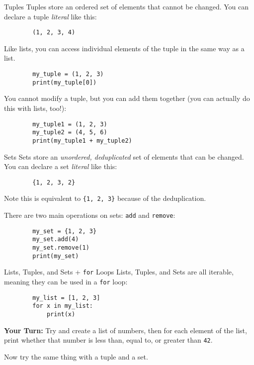 \documentclass{acm}
\begin{document}
\begin{frame}[fragile]{Tuples}
    Tuples store an ordered set of elements that cannot be changed. You can
    declare a tuple \textit{literal} like this:

    \begin{verbatim}
        (1, 2, 3, 4)
    \end{verbatim}

    \pause
    Like lists, you can access individual elements of the tuple in the same way
    as a list.
    \begin{verbatim}
        my_tuple = (1, 2, 3)
        print(my_tuple[0])
    \end{verbatim}

    \pause
    You cannot modify a tuple, but you can add them together (you can actually
    do this with lists, too!):
    \begin{verbatim}
        my_tuple1 = (1, 2, 3)
        my_tuple2 = (4, 5, 6)
        print(my_tuple1 + my_tuple2)
    \end{verbatim}
\end{frame}

\begin{frame}[fragile]{Sets}
    Sets store an \textit{unordered, deduplicated} set of elements that can be
    changed. You can declare a set \textit{literal} like this:

    \begin{verbatim}
        {1, 2, 3, 2}
    \end{verbatim}

    Note this is equivalent to \texttt{\{1, 2, 3\}} because of the deduplication.

    \pause
    There are two main operations on sets: \texttt{add} and \texttt{remove}:
    \begin{verbatim}
        my_set = {1, 2, 3}
        my_set.add(4)
        my_set.remove(1)
        print(my_set)
    \end{verbatim}
\end{frame}

\begin{frame}[fragile]{Lists, Tuples, and Sets + \texttt{for} Loops}
    Lists, Tuples, and Sets are all iterable, meaning they can be used in a
    \texttt{for} loop:
    \begin{verbatim}
        my_list = [1, 2, 3]
        for x in my_list:
            print(x)
    \end{verbatim}

    \pause
    \textbf{Your Turn:} Try and create a list of numbers, then for each element
    of the list, print whether that number is less than, equal to, or greater
    than \texttt{42}.

    \pause
    Now try the same thing with a tuple and a set.
\end{frame}
\end{document}
